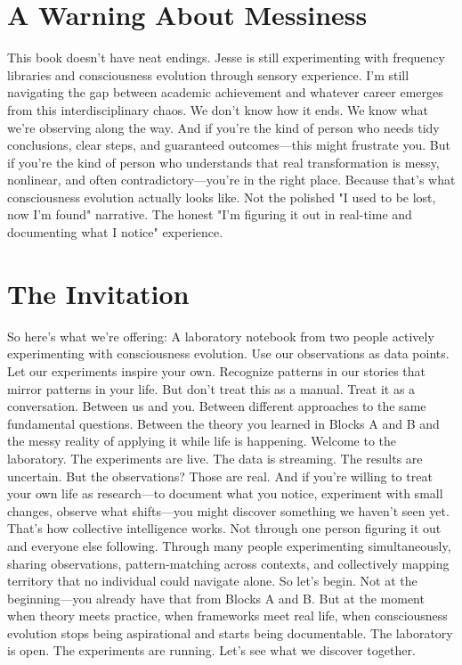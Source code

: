 \section{A Warning About Messiness}

This book doesn't have neat endings.
Jesse is still experimenting with frequency libraries and consciousness evolution through sensory experience. I'm still navigating the gap between academic achievement and whatever career emerges from this interdisciplinary chaos.
We don't know how it ends. We know what we're observing along the way.
And if you're the kind of person who needs tidy conclusions, clear steps, and guaranteed outcomes—this might frustrate you.
But if you're the kind of person who understands that real transformation is messy, nonlinear, and often contradictory—you're in the right place.
Because that's what consciousness evolution actually looks like. Not the polished "I used to be lost, now I'm found" narrative. The honest "I'm figuring it out in real-time and documenting what I notice" experience.

\section{The Invitation}

So here's what we're offering:
A laboratory notebook from two people actively experimenting with consciousness evolution.
Use our observations as data points. Let our experiments inspire your own. Recognize patterns in our stories that mirror patterns in your life.
But don't treat this as a manual. Treat it as a conversation.
Between us and you. Between different approaches to the same fundamental questions. Between the theory you learned in Blocks A and B and the messy reality of applying it while life is happening.
Welcome to the laboratory.
The experiments are live. The data is streaming. The results are uncertain.
But the observations? Those are real.
And if you're willing to treat your own life as research—to document what you notice, experiment with small changes, observe what shifts—you might discover something we haven't seen yet.
That's how collective intelligence works.
Not through one person figuring it out and everyone else following. Through many people experimenting simultaneously, sharing observations, pattern-matching across contexts, and collectively mapping territory that no individual could navigate alone.
So let's begin.
Not at the beginning—you already have that from Blocks A and B. But at the moment when theory meets practice, when frameworks meet real life, when consciousness evolution stops being aspirational and starts being documentable.
The laboratory is open. The experiments are running.
Let's see what we discover together.

